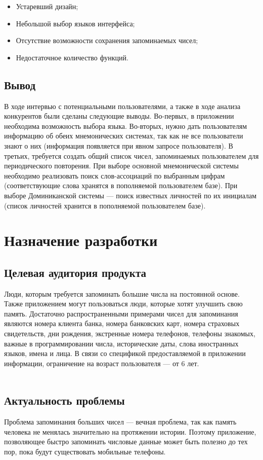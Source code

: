 \documentclass[draft]{article}
\begin{document}
\begin{itemize}
\item Устаревший дизайн;
\item Небольшой выбор языков интерфейса;
\item Отсутствие возможности сохранения запоминаемых чисел;
\item Недостаточное количество функций.
\end{itemize}
\begin{center}
\subsection{Вывод}
\end{center}
В ходе интервью с потенциальными пользователями, а также в ходе анализа конкурентов были сделаны следующие выводы. Во-первых, в приложении необходима возможность выбора языка. Во-вторых, нужно дать пользователям информацию об обеих мнемонических системах, так как не все пользователи знают о них (информация появляется при явном запросе пользователя). В третьих, требуется создать общий список чисел, запоминаемых пользователем для периодического повторения. При выборе основной мнемонической системы необходимо реализовать поиск слов-ассоциаций по выбранным цифрам (соответствующие слова хранятся в пополняемой пользователем базе). При выборе Доминиканской системы — поиск известных личностей по их инициалам (список личностей хранится в пополняемой пользователем базе).\\
\newpage
\section {Назначение разработки}
\subsection{Целевая аудитория продукта}
Люди, которым требуется запоминать большие числа на постоянной основе. Также приложением могут пользоваться люди, которые хотят улучшить свою память. Достаточно распространенными примерами чисел для запоминания являются номера клиента банка, номера банковских карт, номера страховых свидетельств, дни рождения, экстренные номера телефонов, телефоны знакомых, важные в программировании числа, исторические даты, слова иностранных языков, имена и лица. В связи со спецификой предоставляемой в приложении информации, ограничение на возраст пользователя — от 6 лет.\\
~\\
\subsection{Актуальность проблемы}
Проблема запоминания больших чисел — вечная проблема, так как память человека не менялась значительно на протяжении истории. Поэтому приложение, позволяющее быстро запоминать числовые данные может быть полезно до тех пор, пока будут существовать мобильные телефоны.\\
~\\
\end{document}
